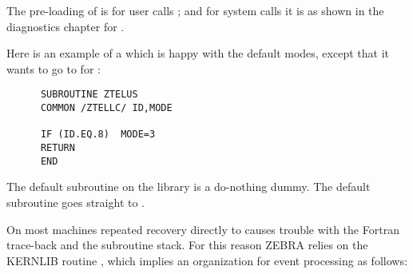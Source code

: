 The pre-loading of  is    for user calls 
;
and for system calls  it is as shown
in the diagnostics chapter for .


Here is an example of a 
which is happy with the default modes,
except that it wants to go to  for :

\begin{verbatim}
      SUBROUTINE ZTELUS
      COMMON /ZTELLC/ ID,MODE

      IF (ID.EQ.8)  MODE=3
      RETURN
      END
\end{verbatim} 
The default subroutine  on the library is a do-nothing dummy.
The default subroutine  goes straight to .


On most machines repeated recovery directly to  causes
trouble with the Fortran trace-back and the subroutine stack.
For this reason ZEBRA relies on the KERNLIB routine ,
which implies an organization for event processing as follows:

